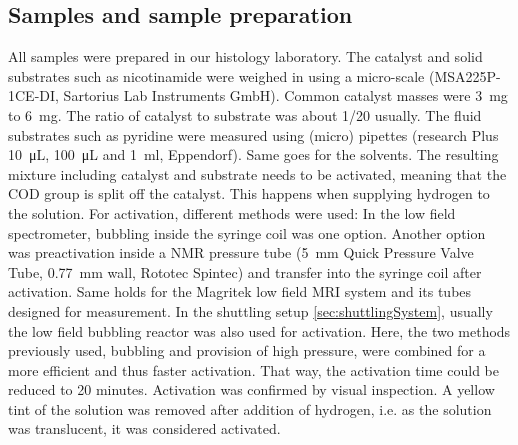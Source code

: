         \subsection{Samples and sample preparation}
        All samples were prepared in our histology laboratory. The catalyst and solid substrates such as nicotinamide were weighed in using a micro-scale (MSA225P-1CE-DI, Sartorius Lab Instruments GmbH). Common catalyst masses were \SI{3}{\milli\gram} to \SI{6}{\milli\gram}. The ratio of catalyst to substrate was about \SI{1/20}{} usually. The fluid substrates such as pyridine were measured using  (micro) pipettes (research Plus \SI{10}{\micro\liter}, \SI{100}{\micro\liter} and \SI{1}{\ml}, Eppendorf). Same goes for the solvents.
        The resulting mixture including catalyst and substrate needs to be activated, meaning that the COD group is split off the catalyst. This happens when supplying hydrogen to the solution. For activation, different methods were used: In the low field spectrometer, bubbling inside the syringe coil was one option. Another option was preactivation inside a NMR pressure tube (\SI{5}{\mm} Quick Pressure Valve Tube, \SI{0.77}{\mm} wall, Rototec Spintec) and transfer into the syringe coil after activation. Same holds for the Magritek low field MRI system and its tubes designed for measurement.
        In the shuttling setup \ref{sec:shuttlingSystem}, usually the low field bubbling reactor was also used for activation. Here, the two methods previously used, bubbling and provision of high pressure, were combined for a more efficient and thus faster activation. That way, the activation time could be reduced to 20 minutes.
        Activation was confirmed by visual inspection. A yellow tint of the solution was removed after addition of hydrogen, i.e. as the solution was translucent, it was considered activated.
